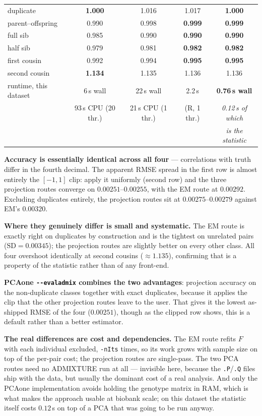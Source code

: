 \documentclass[10pt,a4paper]{article}
\begin{document}
\begin{center}
\begin{tabular}{@{}l cccc@{}}
\quad duplicate         & \textbf{1.000} & 1.016 & 1.017 & \textbf{1.000} \\
\quad parent--offspring & 0.990 & 0.998 & \textbf{0.999} & \textbf{0.999} \\
\quad full sib          & 0.985 & 0.990 & \textbf{0.990} & \textbf{0.990} \\
\quad half sib          & 0.979 & 0.981 & \textbf{0.982} & \textbf{0.982} \\
\quad first cousin      & 0.992 & 0.994 & \textbf{0.995} & \textbf{0.995} \\
\quad second cousin     & \textbf{1.134} & 1.135 & 1.136 & 1.136 \\
\midrule
runtime, this dataset & 6\,s wall & 22\,s wall & 2.2\,s & \textbf{0.76\,s wall} \\
                      & 93\,s CPU (20 thr.) & 21\,s CPU (1 thr.) & (R, 1 thr.) & \emph{0.12\,s of which} \\
                      &  &  &  & \emph{is the statistic} \\
\bottomrule
\end{tabular}
\end{center}

\noindent
\textbf{Accuracy is essentially identical across all four} --- correlations with truth differ in the fourth
decimal. The apparent RMSE spread in the first row is almost entirely the $[-1,1]$ clip: apply it uniformly
(second row) and the three projection routes converge on $0.00251$--$0.00255$, with the EM route at
$0.00292$. Excluding duplicates entirely, the projection routes sit at $0.00275$--$0.00279$ against EM's
$0.00320$.

\textbf{Where they genuinely differ is small and systematic.} The EM route is exactly right on duplicates by
construction and is the tightest on unrelated pairs ($\mathrm{SD}=0.00345$); the projection routes are
slightly better on every other class. All four overshoot identically at second cousins ($\approx1.135$),
confirming that is a property of the statistic rather than of any front-end.

\textbf{PCAone \texttt{-{}-evaladmix} combines the two advantages}: projection accuracy on the non-duplicate
classes together with exact duplicates, because it applies the clip that the other projection routes leave
to the user. That gives it the lowest as-shipped RMSE of the four ($0.00251$), though as the clipped row
shows, this is a default rather than a better estimator.

\textbf{The real differences are cost and dependencies.} The EM route refits $F$ with each individual
excluded, \texttt{-nIts} times, so its work grows with sample size on top of the per-pair cost; the
projection routes are single-pass. The two PCA routes need no ADMIXTURE run at all --- invisible here,
because the \texttt{.P}/\texttt{.Q} files ship with the data, but usually the dominant cost of a real
analysis. And only the PCAone implementation avoids holding the genotype matrix in RAM, which is what makes
the approach usable at biobank scale; on this dataset the statistic itself costs $0.12$\,s on top of a PCA
that was going to be run anyway.
\end{document}
